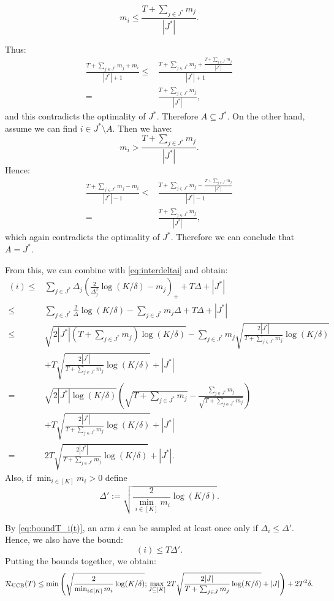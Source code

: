 \[
m_i\leq \frac{T+\sum_{j\in J^*}m_j}{|J^*|}.
\]

Thus:
\begin{align*}
    \frac{T+\sum_{j\in J^*}m_j+m_i}{|J^*|+1}\leq &\frac{T+\sum_{j\in J^*}m_j+\frac{T+\sum_{j\in J^*}m_j}{|J^*|}}{|J^*|+1}\\
    =&\frac{T+\sum_{j\in J^*}m_j}{|J^*|},
\end{align*}
and this contradicts the optimality of $J^*$. Therefore $A\subseteq J^*$. On the other hand, assume we can find $i \in J^* \setminus A$. Then we have:
\[
m_i >\frac{T+\sum_{j\in J^*}m_j}{|J^*|}.
\]
Hence:
\begin{align*}
    \frac{T+\sum_{j\in J^*}m_j-m_i}{|J^*|-1}< &\frac{T+\sum_{j\in J^*}m_j-\frac{T+\sum_{j\in J^*}m_j}{|J^*|}}{|J^*|-1}\\
    =&\frac{T+\sum_{j\in J^*}m_j}{|J^*|},
\end{align*}
which again contradicts the optimality of $J^*$. Therefore we can conclude that $A=J^*$.


From this, we can combine with \cref{eq:interdeltai} and obtain:
\begin{align*}
    (i)\leq& \sum_{j \in J^*}\Delta_j\left( \frac{2}{\Delta_j^2} \log(K/\delta)-m_j\right)_++T\Delta+|J^*|\\
    \leq& \sum_{j \in J^*} \frac{2}{\Delta} \log(K/\delta)-\sum_{j \in J^*}m_j \Delta+T\Delta+|J^*|\\
    \leq& \sqrt{2|J^*|(T+\sum_{j\in J^*}m_j)\log(K/\delta)}-\sum_{j \in J^*}m_j\sqrt{\frac{2|J^*|}{T+\sum_{j\in J^*}m_j}\log(K/\delta)}  \\
    &+T\sqrt{\frac{2|J^*|}{T+\sum_{j\in J^*}m_j}\log(K/\delta)}+|J^*|\\
    =&\sqrt{2|J^*|\log(K/\delta)}\left(\sqrt{T+\sum_{j\in J^*}m_j}-\frac{\sum_{j\in J^*}m_j}{\sqrt{T+\sum_{j\in J^*}m_j}}\right)\\
    &+T\sqrt{\frac{2|J^*|}{T+\sum_{j\in J^*}m_j}\log(K/\delta)}+|J^*|\\
    =&2T\sqrt{\frac{2|J^*|}{T+\sum_{j\in J^*}m_j}\log(K/\delta)}+|J^*|.
\end{align*}
Also, if $\min_{i \in [K]}m_i>0$ define 
\[
\Delta':= \sqrt{\frac{2}{\min_{i \in [K]}m_i}\log(K/\delta)}.
\]

By \cref{eq:boundT_i(t)}, an arm $i$ can be sampled at least once only if $\Delta_i\leq \Delta'$. Hence, we also have the bound:
\[
(i)\leq T \Delta'.
\]
Putting the bounds together, we obtain:
\[
\mathcal{R}_{\textsc{UCB}}(T)\leq \min\left(\sqrt{\frac{2}{\min_{i \in [K]}m_i}\log(K/\delta)};\max_{J\subseteq [K]}2T\sqrt{\frac{2|J|}{T+\sum_{j\in J}m_j}\log(K/\delta)}+|J|\right)+2T^2 \delta.
\]



